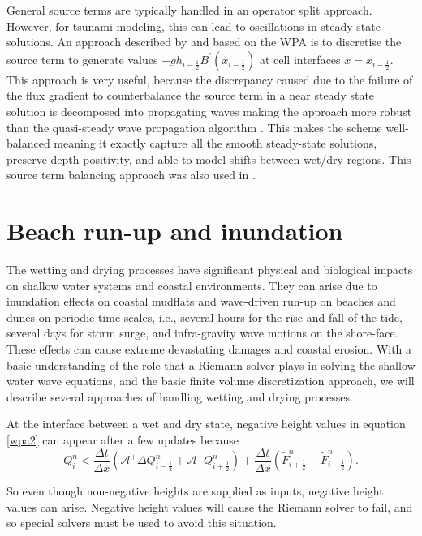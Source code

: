 \documentclass[10pt,a4paper]{article}
\begin{document}
	
	General source terms are typically handled in an operator split approach.  However, for tsunami modeling, this can lead to oscillations in steady state solutions.  An approach described by  \citet{ba-le-mi-ro:2003} and based on the WPA is to discretise the source term to generate values $-gh_{i-\frac{1}{2}}B^{\prime}(x_{i-\frac{1}{2}})$ at  cell interfaces  $x = x_{i-\frac{1}{2}}$. This approach is very useful, because the discrepancy caused due to the failure of the flux gradient to counterbalance the source term in a near steady state solution is decomposed into propagating waves  making the approach more robust than the quasi-steady wave propagation algorithm .  This makes the scheme well-balanced  meaning it exactly capture all the smooth steady-state solutions, preserve depth positivity, and able to model shifts between wet/dry regions. This source term balancing approach was also used in  \citet{chaabelasri1849simple}. 
	
	
	\section{Beach run-up and inundation}
	The wetting and drying processes have significant physical and biological impacts on shallow water systems and coastal environments. They can arise due to inundation effects on coastal mudflats and wave-driven run-up on beaches and dunes on periodic time scales, i.e., several hours for the rise and fall of the tide, several days for storm surge, and infra-gravity wave motions on the shore-face.  These effects can cause extreme devastating damages and coastal erosion.
	With a basic understanding of the role that a Riemann solver plays in solving the shallow water wave equations, and the basic finite volume discretization approach, we will describe several approaches of handling wetting and drying processes.  
	
	At the interface between a wet and dry state, negative height values in equation \eqref{wpa2} can appear after a few updates because
	\begin{equation}
		Q_{i}^{n} < \frac{\Delta t}{\Delta x}(\mathcal{A^{+}}\Delta 	Q_{i-\frac{1}{2}}^{n} + \mathcal{A^{-}}Q_{i+\frac{1}{2}}^{n}) + \frac{\Delta t}{\Delta x} (\tilde{F}_{i+\frac{1}{2}}^{n} - \tilde{F}_{i-\frac{1}{2}}^{n} ).
		\label{wpa22}
	\end{equation}
	
	So even though non-negative heights are supplied as inputs, negative height values can arise.  Negative height values will cause the Riemann solver to fail, and so special solvers must be used to avoid this situation.
	
\end{document}
